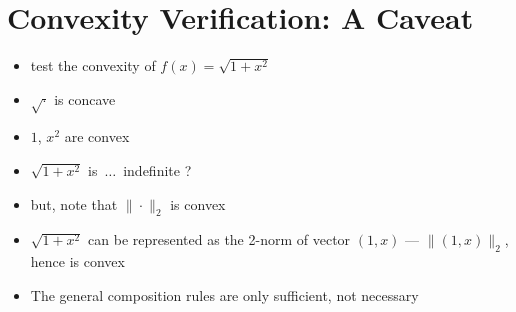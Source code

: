 \documentclass[11pt]{extarticle}
\newcommand{\ds}{\displaystyle}
\theoremstyle{definition}
\begin{document}
\newpage

\section*{Convexity Verification: A Caveat}

\begin{itemize}
  \item test the convexity of $\ds f(x) = \sqrt{1 + x^2}$
  \item $\sqrt{\cdot}$ is concave 
  \item $1$, $x^2$ are convex 
  \item $\sqrt{1 + x^2}$ is $\,\ldots\,$ indefinite ?
  \item but, note that $\ds\|\cdot\|_2$ is convex
  \item $\ds\sqrt{1 + x^2}$ can be represented as the 2-norm of vector $(1, x)$ --- $\ds\|(1, x)\|_2$, hence is convex
  \item The general composition rules are only sufficient, not necessary
\end{itemize}



\end{document}
